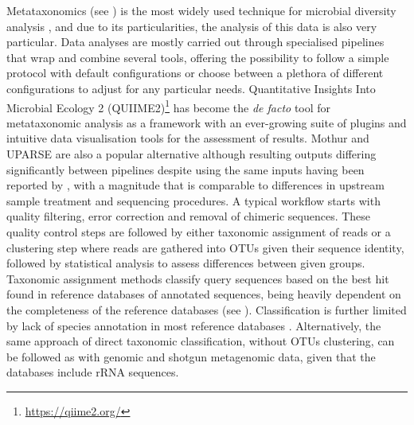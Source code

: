 Metataxonomics (see ) is the most widely used technique for microbial diversity analysis \citep{hilton_metataxonomic_2016}, and due to its particularities, the analysis of this data is also very particular. Data analyses are mostly carried out through specialised pipelines that wrap and combine several tools, offering the possibility to follow a simple protocol with default configurations or choose between a plethora of different configurations to adjust for any particular needs. Quantitative Insights Into Microbial Ecology 2 (QUIIME2)\footnote{\url{https://qiime2.org/}} \citep{bolyen_reproducible_2019} has become the \textit{de facto} tool for metataxonomic analysis as a framework with an ever-growing suite of plugins and intuitive data visualisation tools for the assessment of results. Mothur \citep{schloss_introducing_2009} and UPARSE \citep{edgar_uparse_2013} are also a popular alternative although resulting outputs differing significantly between pipelines despite using the same inputs having been reported by \cite{marizzoni_comparison_2020}, with a magnitude that is comparable to differences in upstream sample treatment and sequencing procedures.  A typical workflow starts with quality filtering, error correction and removal of chimeric sequences. These quality control steps are followed by either taxonomic assignment of reads or a clustering step where reads are gathered into \ac{OTUs} given their sequence identity, followed by statistical analysis to assess differences between given groups. Taxonomic assignment methods classify query sequences based on the best hit found in reference databases of annotated sequences, being heavily dependent on the completeness of the reference databases (see ). Classification is further limited by lack of species annotation in most reference databases \citep{westcott_novo_2015}. Alternatively, the same approach of direct taxonomic classification, without \ac{OTUs} clustering, can be followed as with genomic and shotgun metagenomic data, given that the databases include \ac{rRNA} sequences.


